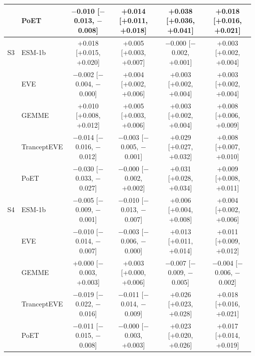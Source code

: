 \begin{tabular}{llcccc}
 & PoET & $-$0.010 [$-$0.013, $-$0.008] & +0.014 [+0.011, +0.018] & +0.038 [+0.036, +0.041] & +0.018 [+0.016, +0.021] \\
\midrule
S3 & ESM-1b & +0.018 [+0.015, +0.020] & +0.005 [+0.003, +0.007] & $-$0.000 [$-$0.002, +0.001] & +0.003 [+0.002, +0.004] \\
 & EVE & $-$0.002 [$-$0.004, $-$0.000] & +0.004 [+0.002, +0.006] & +0.003 [+0.002, +0.004] & +0.003 [+0.002, +0.004] \\
 & GEMME & +0.010 [+0.008, +0.012] & +0.005 [+0.003, +0.006] & +0.003 [+0.002, +0.004] & +0.008 [+0.006, +0.009] \\
 & TranceptEVE & $-$0.014 [$-$0.016, $-$0.012] & $-$0.003 [$-$0.005, $-$0.001] & +0.029 [+0.027, +0.032] & +0.008 [+0.007, +0.010] \\
 & PoET & $-$0.030 [$-$0.033, $-$0.027] & $-$0.000 [$-$0.002, +0.002] & +0.031 [+0.028, +0.034] & +0.009 [+0.008, +0.011] \\
\midrule
S4 & ESM-1b & $-$0.005 [$-$0.009, $-$0.001] & $-$0.010 [$-$0.013, $-$0.007] & +0.006 [+0.004, +0.008] & +0.004 [+0.002, +0.006] \\
 & EVE & $-$0.010 [$-$0.014, $-$0.007] & $-$0.003 [$-$0.006, $-$0.000] & +0.013 [+0.011, +0.014] & +0.011 [+0.009, +0.012] \\
 & GEMME & +0.000 [$-$0.003, +0.003] & +0.003 [+0.000, +0.006] & $-$0.007 [$-$0.009, $-$0.005] & $-$0.004 [$-$0.006, $-$0.002] \\
 & TranceptEVE & $-$0.019 [$-$0.022, $-$0.016] & $-$0.011 [$-$0.014, $-$0.009] & +0.026 [+0.023, +0.028] & +0.018 [+0.016, +0.021] \\
 & PoET & $-$0.011 [$-$0.015, $-$0.008] & $-$0.000 [$-$0.003, +0.003] & +0.023 [+0.020, +0.026] & +0.017 [+0.014, +0.019] \\
\bottomrule
\end{tabular}
